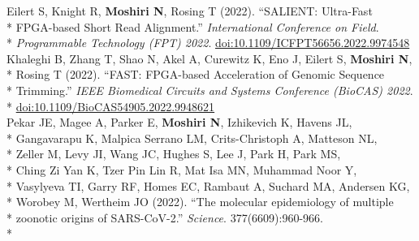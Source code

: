 \documentclass[margin,line]{res}
\begin{document}
\begin{resume}
\hspace*{9.5mm} Eilert S, Knight R, \textbf{Moshiri N}, Rosing T (2022). ``SALIENT: Ultra-Fast\\*
\hspace*{9.5mm} FPGA-based Short Read Alignment.'' \textit{International Conference on Field}.\\*\vspace{2mm}
\hspace*{7mm} \textit{Programmable Technology (FPT) 2022}. \href{https://doi.org/10.1109/ICFPT56656.2022.9974548}{doi:10.1109/ICFPT56656.2022.9974548}\\
\hspace*{4mm} Khaleghi B, Zhang T, Shao N, Akel A, Curewitz K, Eno J, Eilert S, \textbf{Moshiri N},\\*
\hspace*{9.5mm} Rosing T (2022). ``FAST: FPGA-based Acceleration of Genomic Sequence\\*
\hspace*{9.5mm} Trimming.'' \textit{IEEE Biomedical Circuits and Systems Conference (BioCAS) 2022}.\\*\vspace{2mm}
\hspace*{8mm} \href{https://doi.org/10.1109/BioCAS54905.2022.9948621}{doi:10.1109/BioCAS54905.2022.9948621}\\
\hspace*{4mm} Pekar JE, Magee A, Parker E, \textbf{Moshiri N}, Izhikevich K, Havens JL,\\*
\hspace*{9.5mm} Gangavarapu K, Malpica Serrano LM, Crits-Christoph A, Matteson NL,\\*
\hspace*{9.5mm} Zeller M, Levy JI, Wang JC, Hughes S, Lee J, Park H, Park MS,\\*
\hspace*{9.5mm} Ching Zi Yan K, Tzer Pin Lin R, Mat Isa MN, Muhammad Noor Y,\\*
\hspace*{9.5mm} Vasylyeva TI, Garry RF, Homes EC, Rambaut A, Suchard MA, Andersen KG,\\*
\hspace*{9.5mm} Worobey M, Wertheim JO (2022). ``The molecular epidemiology of multiple\\*
\hspace*{9.5mm} zoonotic origins of SARS-CoV-2.'' \textit{Science}. 377(6609):960-966.\\*\vspace{2mm}

\end{resume}
\end{document}
